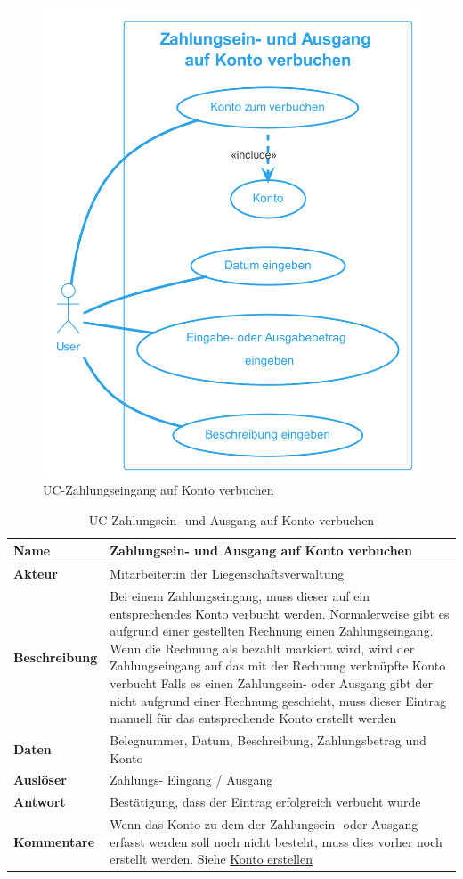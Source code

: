 \newpage
\begin{figure}[H]
  \begin{center}
      \includegraphics[width=0.5\linewidth]{content/diagrams/out/usecase/verbuchenAufKonto/ZahlungseingangaufKontoverbuchen.png}
    \caption{UC-Zahlungseingang auf Konto verbuchen}
    \label{ZahlungaufKonto}
  \end{center}
\end{figure}

\begin{table}[H]
  \centering
  \settowidth{}
  \setlength\extrarowheight{2pt}
  \begin{tabulary}{1.0\textwidth}{|a|m{14cm}|}
    \hline
    \textbf{Name}& Zahlungsein- und Ausgang auf Konto verbuchen\\
    \hline
    \textbf{Akteur}& Mitarbeiter:in der Liegenschaftsverwaltung\\
    \hline 
    \textbf{Beschreibung} & Bei einem Zahlungseingang, muss dieser auf ein entsprechendes Konto verbucht werden. Normalerweise gibt es aufgrund einer gestellten Rechnung einen Zahlungseingang. Wenn die Rechnung als bezahlt markiert wird, wird der Zahlungseingang auf das mit der Rechnung verknüpfte Konto verbucht \newline
    Falls es einen Zahlungsein- oder Ausgang gibt der nicht aufgrund einer Rechnung geschieht, muss dieser Eintrag manuell für das entsprechende Konto erstellt werden\\
    \hline
    \textbf{Daten} & Belegnummer, Datum, Beschreibung, Zahlungsbetrag und Konto\\
    \hline
    \textbf{Auslöser} & Zahlungs- Eingang / Ausgang\\
    \hline
    \textbf{Antwort} & Bestätigung, dass der Eintrag erfolgreich verbucht wurde\\
    \hline
    \textbf{Kommentare} & Wenn das Konto zu dem der Zahlungsein- oder Ausgang erfasst werden soll noch nicht besteht, muss dies vorher noch erstellt werden. Siehe \hyperref[kontoErstellen]{Konto erstellen }\\
    \hline
  \end{tabulary}
  \caption{UC-Zahlungsein- und Ausgang auf Konto verbuchen}
\end{table}

